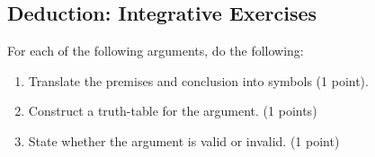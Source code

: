 \documentclass[answers]{exam}
\begin{document}
\begin{questions}

\section{Deduction: Integrative Exercises}

\question For each of the following arguments, do the following:  
\begin{enumerate}
\item Translate the premises and conclusion into symbols (1 point). 
\item Construct a truth-table for the argument. (1 points)
\item State whether the argument is valid or invalid. (1 point)
\end{enumerate} 


\end{questions}
\end{document}
